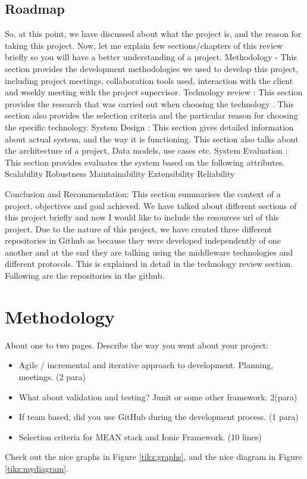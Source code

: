 	\section {Roadmap}
	So, at this point, we have discussed about what the project is, and the reason for taking this project. Now, let me explain few sections/chapters of this review briefly so you will have a better understanding of a project.
	Methodology  - This section provides the development methodologies we used to develop this project, including project meetings, collaboration tools used, interaction with the client and weekly meeting with the project supervisor. 
	Technology review : This section provides the research that was carried out when choosing the technology . This section also provides the selection criteria and the particular reason for choosing the specific technology.
	System Design : This section gives detailed information about actual system, and the way it is functioning. This section also talks about the architecture of a project, Data models, use cases etc.  
	System Evaluation : This section provides evaluates the system based on the following attributes.
	Scalability
	Robustness
	Maintainability
	Extensibility 
	Reliability 
	
	Conclusion and Recommendation: This section summarises the context of a project, objectives and goal achieved. 
	We have talked about different sections of this project briefly and now I would like  to include the resources url of this project.  Due to the nature of this project, we have created three different repositories in Github as because they were developed independently of one another and at the end they are talking using the middleware technologies and different protocols. This is explained in detail in the technology review section.  Following are the repositories in the github.
	

\chapter{Methodology}
About one to two pages.
Describe the way you went about your project:
\begin{itemize}
	\item Agile / incremental and iterative approach to development. Planning, meetings. (2 para)
	\item What about validation and testing? Junit or some other framework. 2(para)
	\item If team based, did you use GitHub during the development process. (1 para)
	
	\item Selection criteria for MEAN stack and Ionic Framework. (10 lines)
\end{itemize}
Check out the nice graphs in Figure \ref{tikz:graphs}, and the nice diagram in Figure \ref{tikz:mydiagram}.

